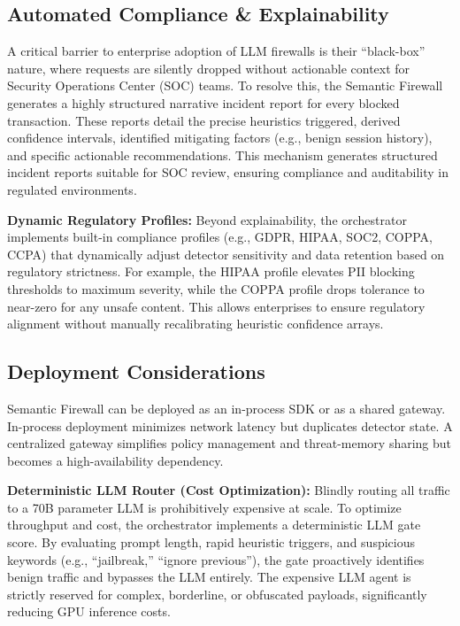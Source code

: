 \documentclass[conference]{IEEEtran}
\begin{document}
\subsection{Automated Compliance \& Explainability}
A critical barrier to enterprise adoption of LLM firewalls is their ``black-box'' nature, where requests are silently dropped without actionable context for Security Operations Center (SOC) teams. To resolve this, the Semantic Firewall generates a highly structured narrative incident report for every blocked transaction. These reports detail the precise heuristics triggered, derived confidence intervals, identified mitigating factors (e.g., benign session history), and specific actionable recommendations. This mechanism generates structured incident reports suitable for SOC review, ensuring compliance and auditability in regulated environments.

\textbf{Dynamic Regulatory Profiles:} Beyond explainability, the orchestrator implements built-in compliance profiles (e.g., GDPR, HIPAA, SOC2, COPPA, CCPA) that dynamically adjust detector sensitivity and data retention based on regulatory strictness. For example, the HIPAA profile elevates PII blocking thresholds to maximum severity, while the COPPA profile drops tolerance to near-zero for any unsafe content. This allows enterprises to ensure regulatory alignment without manually recalibrating heuristic confidence arrays.

\subsection{Deployment Considerations}
Semantic Firewall can be deployed as an in-process SDK or as a shared gateway. In-process deployment minimizes network latency but duplicates detector state. A centralized gateway simplifies policy management and threat-memory sharing but becomes a high-availability dependency.

\textbf{Deterministic LLM Router (Cost Optimization):} Blindly routing all traffic to a 70B parameter LLM is prohibitively expensive at scale. To optimize throughput and cost, the orchestrator implements a deterministic LLM gate score. By evaluating prompt length, rapid heuristic triggers, and suspicious keywords (e.g., ``jailbreak,'' ``ignore previous''), the gate proactively identifies benign traffic and bypasses the LLM entirely. The expensive LLM agent is strictly reserved for complex, borderline, or obfuscated payloads, significantly reducing GPU inference costs.
\end{document}
